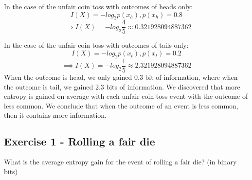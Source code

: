\documentclass[12pt]{article}
\begin{document}
In the case of the unfair coin toss with outcomes of heads only:
\[
	I(X) = - log_2 p(x_h), p(x_h) = 0.8
\]
\[
\implies
	I(X) = - log_2 \frac{4}{5} \approx 0.321928094887362 
\]

In the case of the unfair coin toss with outcomes of tails only:
\[
	I(X) = - log_2 p(x_t), p(x_t) = 0.2
\]
\[
\implies
	I(X) = - log_2 \frac{1}{5} \approx 2.321928094887362 
\]
When the outcome is head, we only gained 0.3 bit of information, where when the outcome is tail, we gained 2.3 bits of information. We discovered that more entropy is gained on average with each unfair coin toss event with the outcome of less common. We conclude that when the outcome of an event is less common, then it contains more information.

\subsection{Exercise 1 - Rolling a fair die }
What is the average entropy gain for the event of rolling a fair die? (in binary bits)
\end{document}
